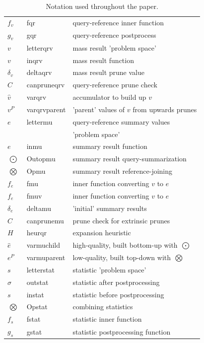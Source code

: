 \documentclass[twoside,leqno,twocolumn]{article}
\newcommand{\summary}{\delta}
\newcommand{\nameOp}[2]{\mathop{#1\nolimits\!\!_{#2}}}
\newcommand{\myOp}[1]{\nameOp{\bigotimes}{#1}}
\newcommand{\letterqr}{v}
\newcommand{\inqr}{v}
\newcommand{\fqr}{f_{\!\letterqr}}
\newcommand{\gqr}{g_{\!\letterqr}}
\newcommand{\letterqrv}{v}
\newcommand{\inqrv}{v}
\newcommand{\deltaqrv}{\summary_{\!\letterqrv}}
\newcommand{\canpruneqrv}{C}%
\newcommand{\varqrv}{\hat{\letterqrv}}
\newcommand{\varqrvparent}{\letterqrv^{P}}
\newcommand{\lettermu}{e}
\newcommand{\inmu}{e}
\newcommand{\Outopmu}{\nameOp{\bigodot}{\lettermu}}%
\newcommand{\Opmu}{\myOp{\lettermu}}
\newcommand{\fmu}{f_{\!\lettermu}}
\newcommand{\fmuv}{f_{\!\lettermu}}
\newcommand{\deltamu}{\summary_{\!\lettermu}}
\newcommand{\canprunemu}{C}
\newcommand{\heurqr}{H}
\newcommand{\varmuchild}{\hat{\lettermu}}
\newcommand{\varmuparent}{\lettermu^{P}}
\newcommand{\letterstat}{s}
\newcommand{\outstat}{\sigma}
\newcommand{\instat}{s}
\newcommand{\Opstat}{\myOp{\letterstat}}
\newcommand{\fstat}{f_{\!\letterstat}}
\newcommand{\gstat}{g_{\!\letterstat}}
\begin{document}
\begin{appendix}
\begin{table}
\begin{tabular}{|l|l|l|}
\\ $\fqr$ & fqr & query-reference inner function
\\ $\gqr$ & gqr & query-reference postprocess
\\ $\letterqrv$ & letterqrv & mass result 'problem space'
\\ $\inqrv$ & inqrv & mass result function
\\ $\deltaqrv$ & deltaqrv & mass result prune value
\\ $\canpruneqrv$ & canpruneqrv & query-reference prune check
\\ $\varqrv$ & varqrv & accumulator to build up $\inqrv$
\\ $\varqrvparent$ & varqrvparent & 'parent' values of $\inqrv$ from upwards prunes
\\ \hline $\lettermu$ & lettermu & query-reference summary values
\\ && 'problem space'
\\ $\inmu$ & inmu & summary result function
\\ $\Outopmu$ & Outopmu & summary result query-summarization
\\ $\Opmu$ & Opmu & summary result reference-joining
\\ $\fmu$ & fmu & inner function converting $\inqr$ to $\inmu$
\\ $\fmuv$ & fmuv & inner function converting $\inqrv$ to $\inmu$
\\ $\deltamu$ & deltamu & 'initial' summary results
\\ $\canprunemu$ & canprunemu & prune check for extrinsic prunes
\\ $\heurqr$ & heurqr & expansion heuristic
\\ $\varmuchild$ & varmuchild & high-quality, built bottom-up with $\Outopmu$
\\ $\varmuparent$ & varmuparent & low-quality, built top-down with $\Opmu$
\\ \hline $\letterstat$ & letterstat & statistic 'problem space'
\\ $\outstat$ & outstat & statistic after postprocessing
\\ $\instat$ & instat & statistic before postprocessing
\\ $\Opstat$ & Opstat & combining statistics
\\ $\fstat$ & fstat & statistic inner function
\\ $\gstat$ & gstat & statistic postprocessing function
\\ \hline
\end{tabular}
\caption{Notation used throughout the paper.}
\label{tab:notation}
\end{table}


\end{appendix}
\end{document}
